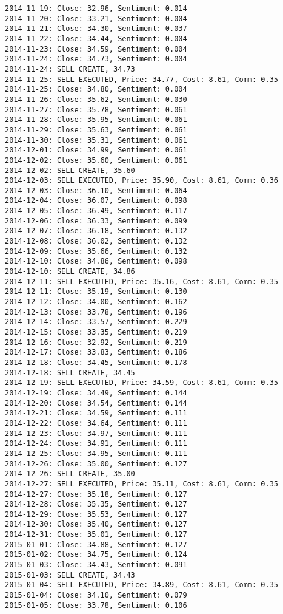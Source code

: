\documentclass[11pt]{article}
\begin{document}
\begin{Verbatim}[commandchars=\\\{\}]
2014-11-19: Close: 32.96, Sentiment: 0.014
2014-11-20: Close: 33.21, Sentiment: 0.004
2014-11-21: Close: 34.30, Sentiment: 0.037
2014-11-22: Close: 34.44, Sentiment: 0.004
2014-11-23: Close: 34.59, Sentiment: 0.004
2014-11-24: Close: 34.73, Sentiment: 0.004
2014-11-24: SELL CREATE, 34.73
2014-11-25: SELL EXECUTED, Price: 34.77, Cost: 8.61, Comm: 0.35
2014-11-25: Close: 34.80, Sentiment: 0.004
2014-11-26: Close: 35.62, Sentiment: 0.030
2014-11-27: Close: 35.78, Sentiment: 0.061
2014-11-28: Close: 35.95, Sentiment: 0.061
2014-11-29: Close: 35.63, Sentiment: 0.061
2014-11-30: Close: 35.31, Sentiment: 0.061
2014-12-01: Close: 34.99, Sentiment: 0.061
2014-12-02: Close: 35.60, Sentiment: 0.061
2014-12-02: SELL CREATE, 35.60
2014-12-03: SELL EXECUTED, Price: 35.90, Cost: 8.61, Comm: 0.36
2014-12-03: Close: 36.10, Sentiment: 0.064
2014-12-04: Close: 36.07, Sentiment: 0.098
2014-12-05: Close: 36.49, Sentiment: 0.117
2014-12-06: Close: 36.33, Sentiment: 0.099
2014-12-07: Close: 36.18, Sentiment: 0.132
2014-12-08: Close: 36.02, Sentiment: 0.132
2014-12-09: Close: 35.66, Sentiment: 0.132
2014-12-10: Close: 34.86, Sentiment: 0.098
2014-12-10: SELL CREATE, 34.86
2014-12-11: SELL EXECUTED, Price: 35.16, Cost: 8.61, Comm: 0.35
2014-12-11: Close: 35.19, Sentiment: 0.130
2014-12-12: Close: 34.00, Sentiment: 0.162
2014-12-13: Close: 33.78, Sentiment: 0.196
2014-12-14: Close: 33.57, Sentiment: 0.229
2014-12-15: Close: 33.35, Sentiment: 0.219
2014-12-16: Close: 32.92, Sentiment: 0.219
2014-12-17: Close: 33.83, Sentiment: 0.186
2014-12-18: Close: 34.45, Sentiment: 0.178
2014-12-18: SELL CREATE, 34.45
2014-12-19: SELL EXECUTED, Price: 34.59, Cost: 8.61, Comm: 0.35
2014-12-19: Close: 34.49, Sentiment: 0.144
2014-12-20: Close: 34.54, Sentiment: 0.144
2014-12-21: Close: 34.59, Sentiment: 0.111
2014-12-22: Close: 34.64, Sentiment: 0.111
2014-12-23: Close: 34.97, Sentiment: 0.111
2014-12-24: Close: 34.91, Sentiment: 0.111
2014-12-25: Close: 34.95, Sentiment: 0.111
2014-12-26: Close: 35.00, Sentiment: 0.127
2014-12-26: SELL CREATE, 35.00
2014-12-27: SELL EXECUTED, Price: 35.11, Cost: 8.61, Comm: 0.35
2014-12-27: Close: 35.18, Sentiment: 0.127
2014-12-28: Close: 35.35, Sentiment: 0.127
2014-12-29: Close: 35.53, Sentiment: 0.127
2014-12-30: Close: 35.40, Sentiment: 0.127
2014-12-31: Close: 35.01, Sentiment: 0.127
2015-01-01: Close: 34.88, Sentiment: 0.127
2015-01-02: Close: 34.75, Sentiment: 0.124
2015-01-03: Close: 34.43, Sentiment: 0.091
2015-01-03: SELL CREATE, 34.43
2015-01-04: SELL EXECUTED, Price: 34.89, Cost: 8.61, Comm: 0.35
2015-01-04: Close: 34.10, Sentiment: 0.079
2015-01-05: Close: 33.78, Sentiment: 0.106

\end{Verbatim}
\end{document}
